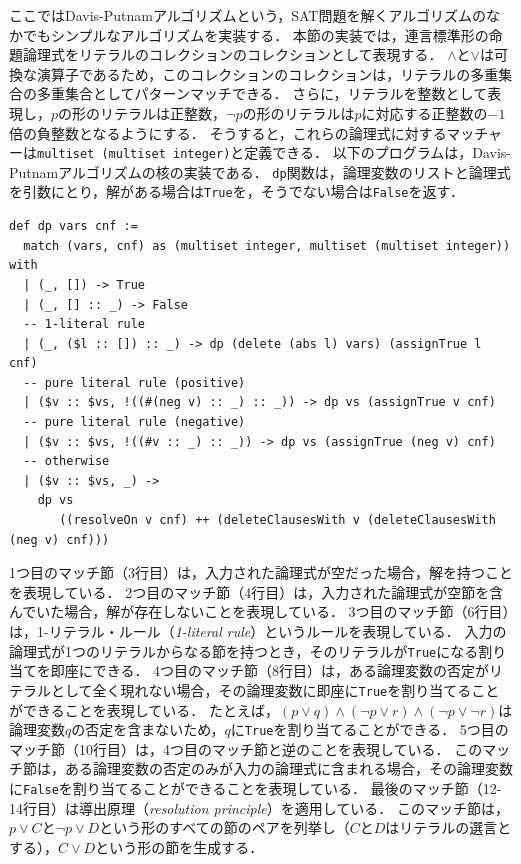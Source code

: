ここではDavis-Putnamアルゴリズム\cite{harrison2009handbook}という，SAT問題を解くアルゴリズムのなかでもシンプルなアルゴリズムを実装する．
本節の実装では，連言標準形の命題論理式をリテラルのコレクションのコレクションとして表現する．
$\wedge$と$\lor$は可換な演算子であるため，このコレクションのコレクションは，リテラルの多重集合の多重集合としてパターンマッチできる．
さらに，リテラルを整数として表現し，$p$の形のリテラルは正整数，$\neg p$の形のリテラルは$p$に対応する正整数の$-1$倍の負整数となるようにする．
そうすると，これらの論理式に対するマッチャーは\lstinline{multiset (multiset integer)}と定義できる．
以下のプログラムは，Davis-Putnamアルゴリズムの核の実装である．
\lstinline{dp}関数は，論理変数のリストと論理式を引数にとり，解がある場合は\lstinline{True}を，そうでない場合は\lstinline{False}を返す．
\begin{lstlisting}[language=egison]
def dp vars cnf :=
  match (vars, cnf) as (multiset integer, multiset (multiset integer)) with
  | (_, []) -> True
  | (_, [] :: _) -> False
  -- 1-literal rule
  | (_, ($l :: []) :: _) -> dp (delete (abs l) vars) (assignTrue l cnf)
  -- pure literal rule (positive)
  | ($v :: $vs, !((#(neg v) :: _) :: _)) -> dp vs (assignTrue v cnf)
  -- pure literal rule (negative)
  | ($v :: $vs, !((#v :: _) :: _)) -> dp vs (assignTrue (neg v) cnf)
  -- otherwise
  | ($v :: $vs, _) ->
    dp vs
       ((resolveOn v cnf) ++ (deleteClausesWith v (deleteClausesWith (neg v) cnf)))
\end{lstlisting}
1つ目のマッチ節（3行目）は，入力された論理式が空だった場合，解を持つことを表現している．
2つ目のマッチ節（4行目）は，入力された論理式が空節を含んでいた場合，解が存在しないことを表現している．
3つ目のマッチ節（6行目）は，1-リテラル・ルール（\emph{1-literal rule}）というルールを表現している．
入力の論理式が1つのリテラルからなる節を持つとき，そのリテラルが\lstinline{True}になる割り当てを即座にできる．
4つ目のマッチ節（8行目）は，ある論理変数の否定がリテラルとして全く現れない場合，その論理変数に即座に\lstinline{True}を割り当てることができることを表現している．
たとえば，$(p \lor q) \wedge (\neg p \lor r) \wedge (\neg p \lor \neg r)$は論理変数$q$の否定を含まないため，$q$に\lstinline{True}を割り当てることができる．
5つ目のマッチ節（10行目）は，4つ目のマッチ節と逆のことを表現している．
このマッチ節は，ある論理変数の否定のみが入力の論理式に含まれる場合，その論理変数に\lstinline{False}を割り当てることができることを表現している．
最後のマッチ節（12-14行目）は導出原理（\emph{resolution principle}）を適用している．
このマッチ節は，$p \lor C$と$\neg p \lor D$という形のすべての節のペアを列挙し（$C$と$D$はリテラルの選言とする），$C \lor D$という形の節を生成する．

